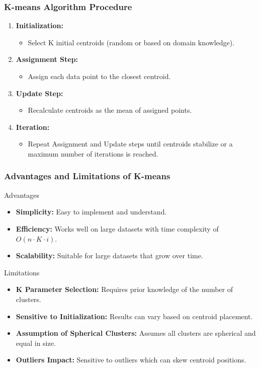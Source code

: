 \documentclass[aspectratio=169]{beamer}
\begin{document}
\begin{frame}[fragile]
    \frametitle{K-means Algorithm Procedure}
    \begin{enumerate}
        \item \textbf{Initialization:}
        \begin{itemize}
            \item Select K initial centroids (random or based on domain knowledge).
        \end{itemize}
        \item \textbf{Assignment Step:}
        \begin{itemize}
            \item Assign each data point to the closest centroid.
        \end{itemize}
        \item \textbf{Update Step:}
        \begin{itemize}
            \item Recalculate centroids as the mean of assigned points.
        \end{itemize}
        \item \textbf{Iteration:}
        \begin{itemize}
            \item Repeat Assignment and Update steps until centroids stabilize or a maximum number of iterations is reached.
        \end{itemize}
    \end{enumerate}
\end{frame}

\begin{frame}[fragile]
    \frametitle{Advantages and Limitations of K-means}
    \begin{block}{Advantages}
        \begin{itemize}
            \item \textbf{Simplicity:} Easy to implement and understand.
            \item \textbf{Efficiency:} Works well on large datasets with time complexity of \(O(n \cdot K \cdot i)\).
            \item \textbf{Scalability:} Suitable for large datasets that grow over time.
        \end{itemize}
    \end{block}
    
    \begin{block}{Limitations}
        \begin{itemize}
            \item \textbf{K Parameter Selection:} Requires prior knowledge of the number of clusters.
            \item \textbf{Sensitive to Initialization:} Results can vary based on centroid placement.
            \item \textbf{Assumption of Spherical Clusters:} Assumes all clusters are spherical and equal in size.
            \item \textbf{Outliers Impact:} Sensitive to outliers which can skew centroid positions.
        \end{itemize}
    \end{block}
\end{frame}
\end{document}
